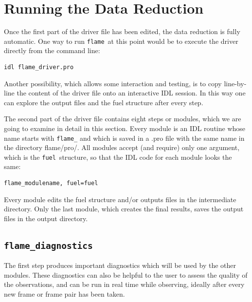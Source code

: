 \documentclass[a4paper, notitlepage]{article}
\newcommand{\flame}{\texttt{flame}}
\newcommand{\fuel}{\texttt{fuel}}
\begin{document}



\section{Running the Data Reduction}

Once the first part of the driver file has been edited, the data reduction is fully automatic. One way to run \flame\ at this point would be to execute the driver directly from the command line:
\begin{lstlisting}
idl flame_driver.pro
\end{lstlisting}
Another possibility, which allows some interaction and testing, is to copy line-by-line the content of the driver file onto an interactive IDL session. In this way one can explore the output files and the fuel structure after every step.

The second part of the driver file contains eight steps or modules, which we are going to examine in detail in this section. Every module is an IDL routine whose name starts with \texttt{flame\_} and which is saved in a .pro file with the same name in the directory flame/pro/. All modules accept (and require) only one argument, which is the \fuel\ structure, so that the IDL code for each module looks the same:
\begin{lstlisting}
flame_modulename, fuel=fuel
\end{lstlisting}

Every module edits the fuel structure and/or outputs files in the intermediate directory. Only the last module, which creates the final results, saves the output files in the output directory.



\subsection{\texttt{flame\_diagnostics}}
\label{sec:diagnostics}

The first step produces important diagnostics which will be used by the other modules. These diagnostics can also be helpful to the user to assess the quality of the observations, and can be run in real time while observing, ideally after every new frame or frame pair has been taken.
\end{document}
